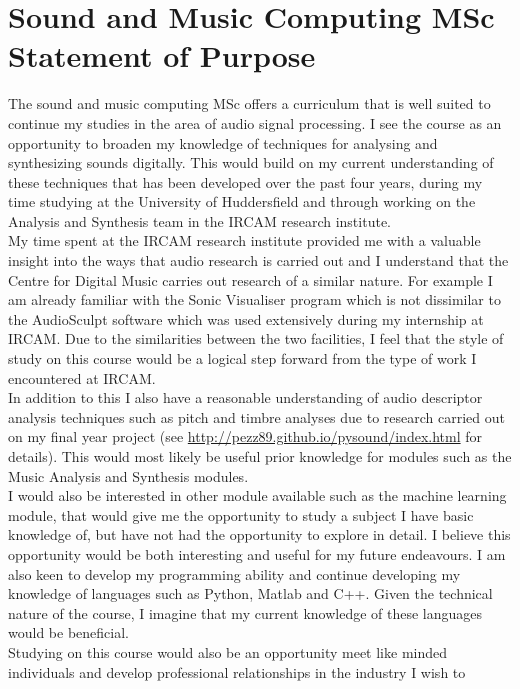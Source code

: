 \documentclass[10pt,letterpaper]{article}
\begin{document}
\section*{\Large Sound and Music Computing MSc \\ \large Statement of Purpose}
The sound and music computing MSc offers a curriculum that is well suited to
continue my studies in the area of audio signal processing. I see the course as
an opportunity to broaden my knowledge of techniques for analysing and
synthesizing sounds digitally. This would build on my current understanding of
these techniques that has been developed over the past four years, during my
time studying at the University of Huddersfield and through working on the
Analysis and Synthesis team in the IRCAM research institute.\\ 
My time spent at the IRCAM research institute provided me with a valuable
insight into the ways that audio research is carried out and I understand that
the Centre for Digital Music carries out research of a similar nature. For
example I am already familiar with the Sonic Visualiser program which is not
dissimilar to the AudioSculpt software which was used extensively during my
internship at IRCAM. Due to the similarities between the two facilities, I
feel that the style of study on this course would be a logical step forward
from the type of work I encountered at IRCAM.\\ 
In addition to this I also have a reasonable understanding of audio descriptor
analysis techniques such as pitch and timbre analyses due to research carried
out on my final year project (see
\href{http://pezz89.github.io/pysound/index.html}{http://pezz89.github.io/pysound/index.html}
for details). This would most likely be useful prior knowledge for modules such
as the Music Analysis and Synthesis modules. \\
I would also be interested in other module available such as the machine
learning module, that would give me the opportunity to study a subject I have
basic knowledge of, but have not had the opportunity to explore in detail. I
believe this opportunity would be both interesting and useful for my future
endeavours.  I am also keen to develop my programming ability and continue
developing my knowledge of languages such as Python, Matlab and C++. Given the
technical nature of the course, I imagine that my  current knowledge of these
languages would be beneficial. \\
Studying on this course would also be an opportunity meet like minded
individuals and develop professional relationships in the industry I wish to
\end{document}
